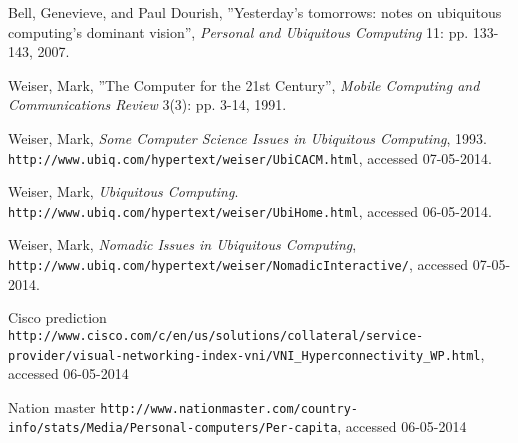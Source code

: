 \begin{thebibliography}{9}

        Bell, Genevieve, and Paul Dourish,
        ''Yesterday's tomorrows: notes on ubiquitous computing's dominant vision'',
        \emph{Personal and Ubiquitous Computing} 11: pp. 133-143,
        2007.
        
        Weiser, Mark,
        ''The Computer for the 21st Century'',
        \emph{Mobile Computing and Communications Review} 3(3): pp. 3-14,
        1991.
		
		Weiser, Mark,
		\emph{Some Computer Science Issues in Ubiquitous Computing},
		1993.
		\verb+http://www.ubiq.com/hypertext/weiser/UbiCACM.html+, accessed 07-05-2014.
        
        Weiser, Mark,
        \emph{Ubiquitous Computing}.
        \verb+http://www.ubiq.com/hypertext/weiser/UbiHome.html+, accessed 06-05-2014.
        
		Weiser, Mark,
		\emph{Nomadic Issues in Ubiquitous Computing},
		\verb+http://www.ubiq.com/hypertext/weiser/NomadicInteractive/+, accessed 07-05-2014.
		
        Cisco prediction
        \verb+http://www.cisco.com/c/en/us/solutions/collateral/service-provider/visual-networking-index-vni/VNI_Hyperconnectivity_WP.html+, accessed 06-05-2014
        
        Nation master
        \verb+http://www.nationmaster.com/country-info/stats/Media/Personal-computers/Per-capita+, accessed 06-05-2014
 
\end{thebibliography}